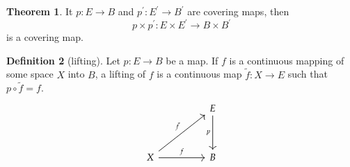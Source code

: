 \documentclass[12pt,a4paper]{book}
\theoremstyle{definition}
\newtheorem{defn}{Definition}[section]
\newtheorem{theo}[defn]{Theorem}
\begin{document}
\begin{theo}
    It $p: E \rightarrow B$ and $p^{\prime}: E^{\prime} \rightarrow B^{\prime}$ are covering maps, then
    $$
        p \times p^{\prime}: E \times E^{\prime} \rightarrow B \times B^{\prime}
    $$
    is a covering map.
\end{theo}
\begin{defn}[lifting]
    Let $p: E \rightarrow B$ be a map. If $f$ is a continuous mapping of some space $X$ into $B$, a lifting of $f$ is a continuous map $\tilde{f}: X \rightarrow E$ such that $p \circ \tilde{f}=f$.
    \[\begin{tikzcd}
            && E \\
            \\
            X && B
            \arrow["f", from=3-1, to=3-3]
            \arrow["p"', from=1-3, to=3-3]
            \arrow["{\tilde{f}}", from=3-1, to=1-3]
        \end{tikzcd}\]
\end{defn}
\end{document}
